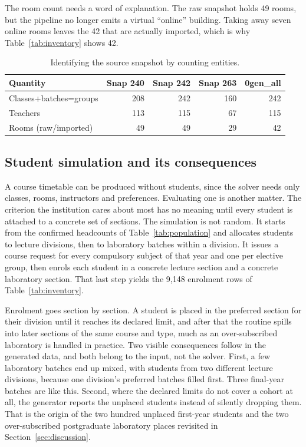 \documentclass[journal]{IEEEtran}
\begin{document}
The room count needs a word of explanation. The raw snapshot holds 49 rooms, but the pipeline no longer emits a virtual ``online'' building. Taking away seven online rooms leaves the 42 that are actually imported, which is why Table~\ref{tab:inventory} shows 42.

\begin{table}[t]
\centering
\caption{Identifying the source snapshot by counting entities.}
\label{tab:snapshot}
\scriptsize
\begin{tabular}{@{}lrrrr@{}}
\toprule
Quantity & Snap 240 & Snap 242 & Snap 263 & 0gen\_all \\
\midrule
Classes+batches=groups & 208 & 242 & 160 & 242 \\
Teachers & 113 & 115 & 67 & 115 \\
Rooms (raw/imported) & 49 & 49 & 29 & 42 \\
\bottomrule
\end{tabular}
\end{table}

\subsection{Student simulation and its consequences}
A course timetable can be produced without students, since the solver needs only classes, rooms, instructors and preferences. Evaluating one is another matter. The criterion the institution cares about most has no meaning until every student is attached to a concrete set of sections. The simulation is not random. It starts from the confirmed headcounts of Table~\ref{tab:population} and allocates students to lecture divisions, then to laboratory batches within a division. It issues a course request for every compulsory subject of that year and one per elective group, then enrols each student in a concrete lecture section and a concrete laboratory section. That last step yields the 9{,}148 enrolment rows of Table~\ref{tab:inventory}.

Enrolment goes section by section. A student is placed in the preferred section for their division until it reaches its declared limit, and after that the routine spills into later sections of the same course and type, much as an over-subscribed laboratory is handled in practice. Two visible consequences follow in the generated data, and both belong to the input, not the solver. First, a few laboratory batches end up mixed, with students from two different lecture divisions, because one division's preferred batches filled first. Three final-year batches are like this. Second, where the declared limits do not cover a cohort at all, the generator reports the unplaced students instead of silently dropping them. That is the origin of the two hundred unplaced first-year students and the two over-subscribed postgraduate laboratory places revisited in Section~\ref{sec:discussion}.
\end{document}
